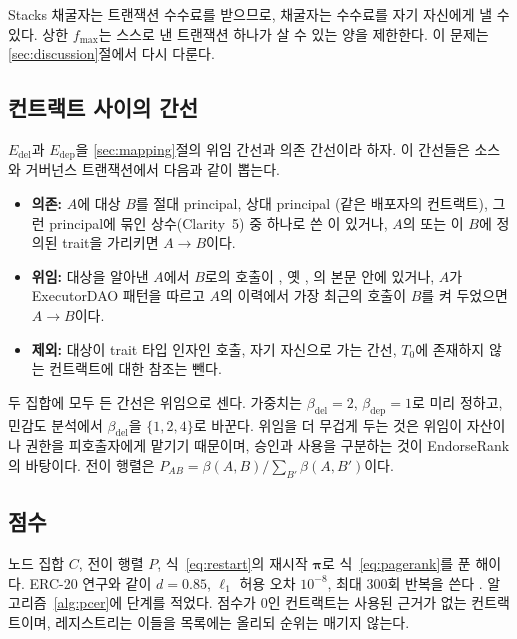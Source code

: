Stacks 채굴자는 트랜잭션 수수료를 받으므로, 채굴자는 수수료를 자기 자신에게 낼 수 있다. 상한 $f_{\max}$는 스스로 낸 트랜잭션 하나가 살 수 있는 양을 제한한다. 이 문제는 \ref{sec:discussion}절에서 다시 다룬다.

\subsection{컨트랙트 사이의 간선}

$E_{\mathrm{del}}$과 $E_{\mathrm{dep}}$을 \ref{sec:mapping}절의 위임 간선과 의존 간선이라 하자. 이 간선들은 소스와 거버넌스 트랜잭션에서 다음과 같이 뽑는다.

\begin{itemize}
\item \textbf{의존:} $A$에 대상 $B$를 절대 principal, 상대 principal (같은 배포자의 컨트랙트), 그런 principal에 묶인 상수(Clarity~5) 중 하나로 쓴 이 있거나, $A$의  또는 이 $B$에 정의된 trait을 가리키면 $A\to B$이다.
\item \textbf{위임:} 대상을 알아낸 $A$에서 $B$로의 호출이 , 옛 , 의 본문 안에 있거나, $A$가 ExecutorDAO 패턴을 따르고 $A$의 이력에서 가장 최근의  호출이 $B$를 켜 두었으면 $A\to B$이다.
\item \textbf{제외:} 대상이 trait 타입 인자인 호출, 자기 자신으로 가는 간선, $T_0$에 존재하지 않는 컨트랙트에 대한 참조는 뺀다.
\end{itemize}

두 집합에 모두 든 간선은 위임으로 센다. 가중치는 $\beta_{\mathrm{del}}=2$, $\beta_{\mathrm{dep}}=1$로 미리 정하고, 민감도 분석에서 $\beta_{\mathrm{del}}$을 $\{1,2,4\}$로 바꾼다. 위임을 더 무겁게 두는 것은 위임이 자산이나 권한을 피호출자에게 맡기기 때문이며, 승인과 사용을 구분하는 것이 EndorseRank의 바탕이다. 전이 행렬은 $P_{AB}=\beta(A,B)/\sum_{B'}\beta(A,B')$이다.

\subsection{점수}

 노드 집합 $C$, 전이 행렬 $P$, 식~\eqref{eq:restart}의 재시작 $\boldsymbol{\pi}$로 식~\eqref{eq:pagerank}를 푼 해이다. ERC-20 연구와 같이 $d=0.85$, $\ell_1$ 허용 오차 $10^{-8}$, 최대 300회 반복을 쓴다 \cite{kwon2026endorserank}. 알고리즘~\ref{alg:pcer}에 단계를 적었다. 점수가 0인 컨트랙트는 사용된 근거가 없는 컨트랙트이며, 레지스트리는 이들을 목록에는 올리되 순위는 매기지 않는다.

